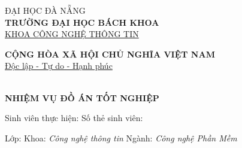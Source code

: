 \fontsize{13px}{13px}\selectfont\justifying

	\begin{minipage}[t]{.5\textwidth}
		\centering
		ĐẠI HỌC ĐÀ NẴNG\\
		\textbf{TRƯỜNG ĐẠI HỌC BÁCH KHOA}\\
		\underline{KHOA CÔNG NGHỆ THÔNG TIN}
	\end{minipage}\hfill 
	\begin{minipage}[t]{.5\textwidth}
		\centering
		\textbf{CỘNG HÒA XÃ HỘI CHỦ NGHĨA VIỆT NAM}\\
		\underline{Độc lập - Tự do - Hạnh phúc}
	\end{minipage}\\[2em]
	
	\center\Large\textbf{NHIỆM VỤ ĐỒ ÁN TỐT NGHIỆP}
	\vspace{14px}
	\fontsize{12px}{12px}\selectfont
	
	Sinh viên thực hiện: \emph\me \dotfill Số thẻ sinh viên: \emph\msv \dotfill 
	
	Lớp: \emph\myclass \dotfill Khoa: \emph{Công nghệ thông tin} \dotfill Ngành: \emph{Công nghệ Phần Mềm} \dotfill
	
